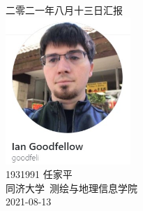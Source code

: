 \documentclass[a4paper, 12pt]{article}
\begin{document}
\begin{center}
    {\Huge 
        二零二一年八月十三日汇报}\\[20pt]
    
    \includegraphics[height=15em]{pic/cover.jpg} \\[15pt] 

    {\Large 
        1931991 任家平\\[12pt]
        同济大学~测绘与地理信息学院\\[12pt]
        2021-08-13}
\end{center}
\thispagestyle{empty}



\newpage
{}
\tableofcontents
\newpage
{}




\listoffigures
{}
\listoftables
{}
\newpage
\nocite{*}


\end{document}
